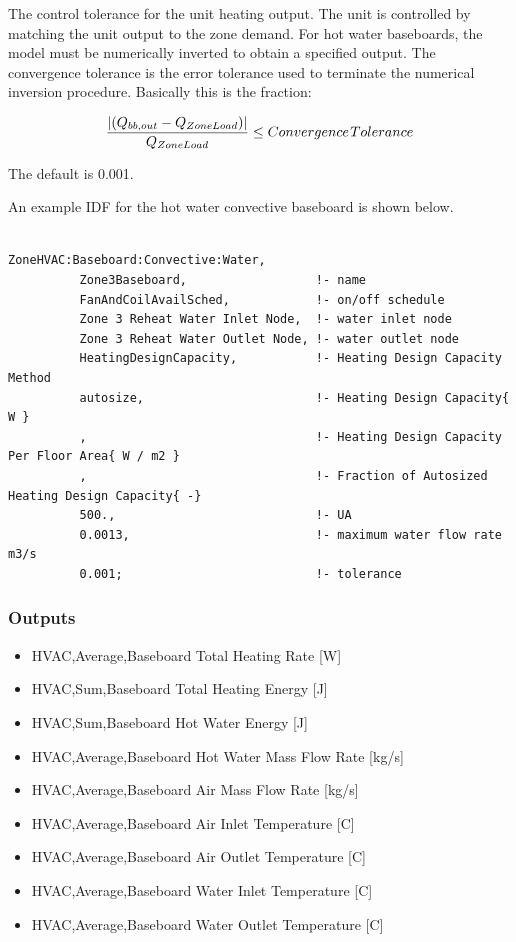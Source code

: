The control tolerance for the unit heating output. The unit is controlled by matching the unit output to the zone demand. For hot water baseboards, the model must be numerically inverted to obtain a specified output. The convergence tolerance is the error tolerance used to terminate the numerical inversion procedure. Basically this is the fraction:

\begin{equation}
\frac{{\left| {({Q_{bb,out}} - {Q_{ZoneLoad}})} \right|}}{{{Q_{ZoneLoad}}}} \le Convergence{\kern 1pt} Tolerance
\end{equation}

The default is 0.001.

An example IDF for the hot water convective baseboard is shown below.

\begin{lstlisting}

ZoneHVAC:Baseboard:Convective:Water,
          Zone3Baseboard,                  !- name
          FanAndCoilAvailSched,            !- on/off schedule
          Zone 3 Reheat Water Inlet Node,  !- water inlet node
          Zone 3 Reheat Water Outlet Node, !- water outlet node
          HeatingDesignCapacity,           !- Heating Design Capacity Method
          autosize,                        !- Heating Design Capacity{ W }
          ,                                !- Heating Design Capacity Per Floor Area{ W / m2 }
          ,                                !- Fraction of Autosized Heating Design Capacity{ -}
          500.,                            !- UA
          0.0013,                          !- maximum water flow rate m3/s
          0.001;                           !- tolerance
\end{lstlisting}

\subsubsection{Outputs}\label{outputs-3-015}

\begin{itemize}
\item
  HVAC,Average,Baseboard Total Heating Rate {[}W{]}
\item
  HVAC,Sum,Baseboard Total Heating Energy {[}J{]}
\item
  HVAC,Sum,Baseboard Hot Water Energy {[}J{]}
\item
  HVAC,Average,Baseboard Hot Water Mass Flow Rate {[}kg/s{]}
\item
  HVAC,Average,Baseboard Air Mass Flow Rate {[}kg/s{]}
\item
  HVAC,Average,Baseboard Air Inlet Temperature {[}C{]}
\item
  HVAC,Average,Baseboard Air Outlet Temperature {[}C{]}
\item
  HVAC,Average,Baseboard Water Inlet Temperature {[}C{]}
\item
  HVAC,Average,Baseboard Water Outlet Temperature {[}C{]}
\end{itemize}

